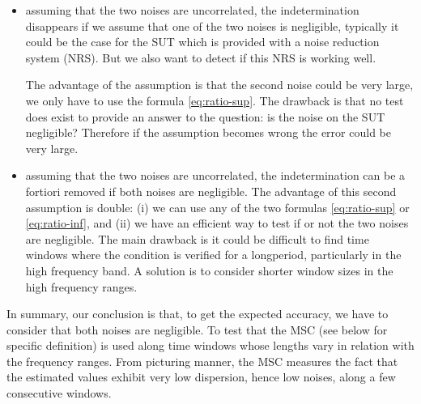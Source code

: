 \begin{itemize}
\item
assuming that the two noises are uncorrelated, the indetermination disappears if  we assume that one of the two noises is negligible, typically it could be the case for the SUT which is provided with a noise reduction system (NRS). But we also want to detect if this NRS is working well.

The advantage of the  assumption is that the second noise could be very large, we only have to use the formula \eqref{eq:ratio-sup}. The drawback is that no test does exist to provide an answer to the question: is the noise on the SUT negligible? Therefore if the assumption becomes wrong the error could be very large.

\item
assuming that the two noises are uncorrelated, the indetermination can be a fortiori removed if both noises are negligible. The advantage of this second assumption is double: (i) we can use any of the two formulas \eqref{eq:ratio-sup} or \eqref{eq:ratio-inf}, and (ii) we have an efficient way to test if or not the two noises are negligible. The main drawback is it could be difficult to find time windows where the condition is verified for a longperiod, particularly in the high frequency band. A solution is to consider shorter window sizes in the high frequency ranges. 



\end{itemize}

In summary, our conclusion is that, to get the expected accuracy, we have to consider that both noises are negligible. To test that the MSC (see below for specific definition) is used along time windows whose lengths vary in relation with the frequency ranges. From picturing manner, the MSC measures the fact that the estimated values exhibit very low dispersion, hence low noises, along a few consecutive windows. 
 
